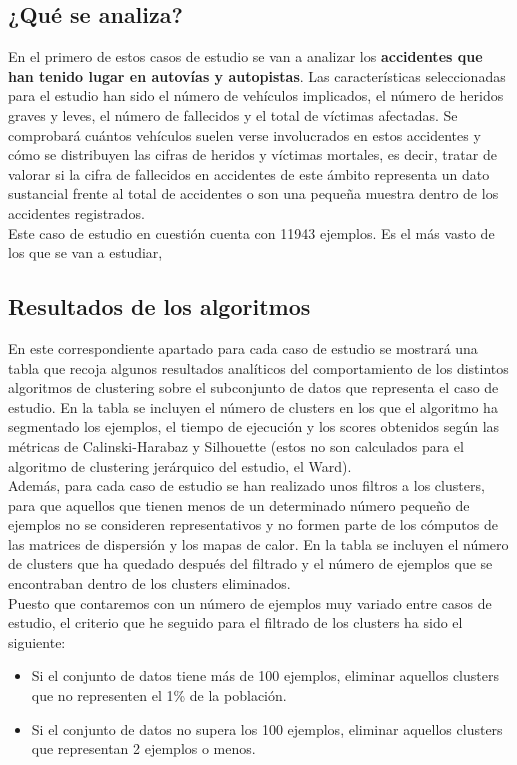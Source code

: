 	\subsection{¿Qué se analiza?}
	En el primero de estos casos de estudio se van a analizar los \textbf{accidentes que han tenido lugar en autovías y autopistas}. Las características seleccionadas para el estudio han sido el número de vehículos implicados, el número de heridos graves y leves, el número de fallecidos y el total de víctimas afectadas. Se comprobará cuántos vehículos suelen verse involucrados en estos accidentes y cómo se distribuyen las cifras de heridos y víctimas mortales, es decir, tratar de valorar si la cifra de fallecidos en accidentes de este ámbito representa un dato sustancial frente al total de accidentes o son una pequeña muestra dentro de los accidentes registrados.\\
	
	Este caso de estudio en cuestión cuenta con 11943 ejemplos. Es el más vasto de los que se van a estudiar,
	
	\subsection{Resultados de los algoritmos}
	En este correspondiente apartado para cada caso de estudio se mostrará una tabla que recoja algunos resultados analíticos del comportamiento de los distintos algoritmos de clustering sobre el subconjunto de datos que representa el caso de estudio. En la tabla se incluyen el número de clusters en los que el algoritmo ha segmentado los ejemplos, el tiempo de ejecución y los scores obtenidos según las métricas de Calinski-Harabaz y Silhouette (estos no son calculados para el algoritmo de clustering jerárquico del estudio, el Ward).\\
	
	Además, para cada caso de estudio se han realizado unos filtros a los clusters, para que aquellos que tienen menos de un determinado número pequeño de ejemplos no se consideren representativos y no formen parte de los cómputos de las matrices de dispersión y los mapas de calor. En la tabla se incluyen el número de clusters que ha quedado después del filtrado y el número de ejemplos que se encontraban dentro de los clusters eliminados.\\
	
	Puesto que contaremos con un número de ejemplos muy variado entre casos de estudio, el criterio que he seguido para el filtrado de los clusters ha sido el siguiente:
	\begin{itemize}
		\item Si el conjunto de datos tiene más de 100 ejemplos, eliminar aquellos clusters que no representen el 1\% de la población.
		\item Si el conjunto de datos no supera los 100 ejemplos, eliminar aquellos clusters que representan 2 ejemplos o menos.
	\end{itemize}

